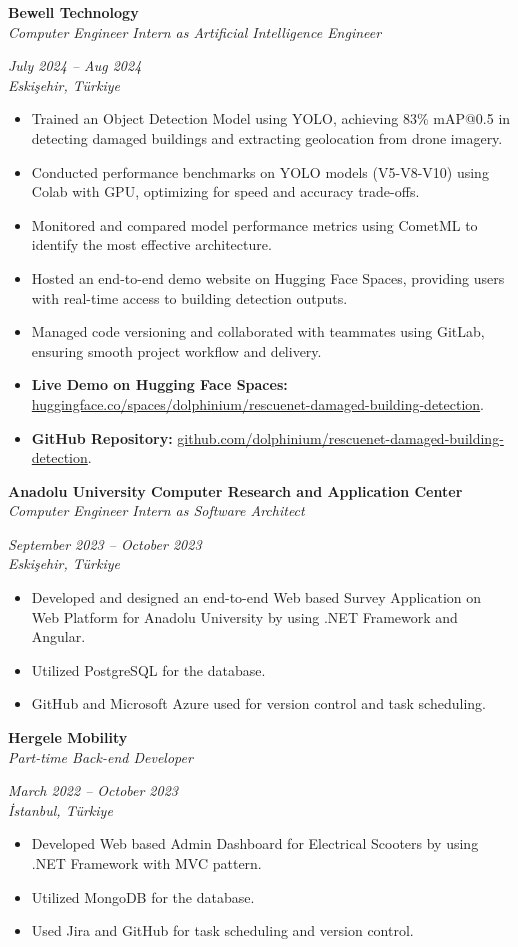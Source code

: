 \documentclass[10pt, a4paper]{article}
\newcommand{\cvitem}[4]{%
  \par\needspace{3\baselineskip}%
  \noindent%
  \begin{minipage}[t]{\dimexpr\linewidth-12em}%
    \textbf{#1} \\%
    \textit{#3} %
  \end{minipage}%
  \hfill%
  \begin{minipage}[t]{14em}%
    \raggedleft%
    \textit{#2} \\%
    \textit{#4} %
  \end{minipage}%
  \par %
}
\begin{document}
\cvitem{Bewell Technology}{July 2024 -- Aug 2024} %
       {Computer Engineer Intern as Artificial Intelligence Engineer}{Eskişehir, Türkiye}
\begin{itemize}
    \item Trained an Object Detection Model using YOLO, achieving 83\% mAP@0.5 in detecting damaged buildings and extracting geolocation from drone imagery.
    \item Conducted performance benchmarks on YOLO models (V5-V8-V10) using Colab with GPU, optimizing for speed and accuracy trade-offs.
    \item Monitored and compared model performance metrics using CometML to identify the most effective architecture.
    \item Hosted an end-to-end demo website on Hugging Face Spaces, providing users with real-time access to building detection outputs.
    \item Managed code versioning and collaborated with teammates using GitLab, ensuring smooth project workflow and delivery.
    \item \textbf{Live Demo on Hugging Face Spaces:} \href{https://huggingface.co/spaces/dolphinium/rescuenet-damaged-building-detection}{huggingface.co/spaces/dolphinium/rescuenet-damaged-building-detection}.
    \item \textbf{GitHub Repository:} \href{https://github.com/dolphinium/rescuenet-damaged-building-detection}{github.com/dolphinium/rescuenet-damaged-building-detection}.
\end{itemize}

\cvitem{Anadolu University Computer Research and Application Center}{September 2023 -- October 2023}
       {Computer Engineer Intern as Software Architect}{Eskişehir, Türkiye}
\begin{itemize}
    \item Developed and designed an end-to-end Web based Survey Application on Web Platform for Anadolu University by using .NET Framework and Angular.
    \item Utilized PostgreSQL for the database.
    \item GitHub and Microsoft Azure used for version control and task scheduling.
\end{itemize}

\cvitem{Hergele Mobility}{March 2022 -- October 2023}
       {Part-time Back-end Developer}{İstanbul, Türkiye}
\begin{itemize}
    \item Developed Web based Admin Dashboard for Electrical Scooters by using .NET Framework with MVC pattern.
    \item Utilized MongoDB for the database.
    \item Used Jira and GitHub for task scheduling and version control.
\end{itemize}
\end{document}
